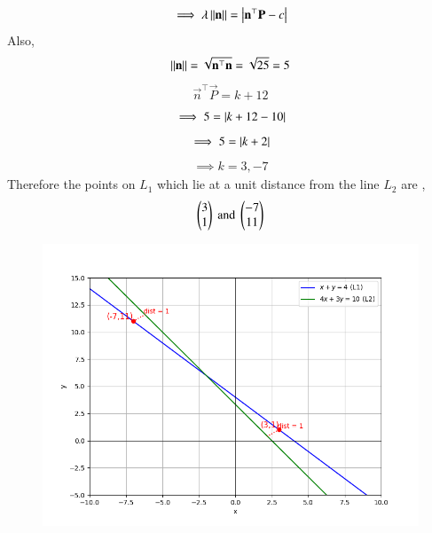 \documentclass[journal]{IEEEtran}
\begin{document}
\begin{align}
    \implies \lambda\left\lVert\mathbf{n}\right\rVert = \left\vert\mathbf{n}^{\top}\mathbf{P} - c\right\vert
\end{align}
Also,
\begin{align}
    \left\lVert\mathbf{n}\right\rVert=\sqrt{\mathbf{n}^{\top}\mathbf{n}} = \sqrt{25} = 5
\end{align}
\begin{align}
    \vec{n}^{\top}\vec{P} = k + 12
\end{align}
\newpage
\begin{align}
    \implies 5 = \left\vert k + 12 - 10\right\vert
\end{align}
\begin{align}
    \implies 5 = \left\vert k + 2\right\vert
\end{align}
\begin{align}
    \implies k = 3, -7
\end{align}
Therefore the points on $L_1$ which lie at a unit distance from the line $L_2$ are ,
\begin{align*}
    \begin{pmatrix}3\\1\end{pmatrix} \ \text{and} \ \begin{pmatrix}-7\\11\end{pmatrix}
\end{align*}

\begin{figure}[H]
    \centering
    \includegraphics[width=0.8\columnwidth]{figs/fig.png}
    \label{fig:1}
\end{figure}
\end{document}
